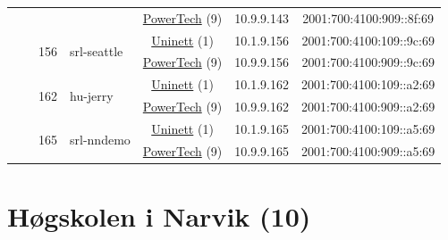\begin{small}
\begin{center}
\begin{longtable}{|c|c|c|c|c|c|c|c|}
  &  &  &  & \multicolumn{2}{|c|}{\tiny{\href{http://www.powertech.no}{PowerTech} (9)}} & \tiny{10.9.9.143} & \tiny{2001:700:4100:909::8f:69} \\* \cline{3-3}\cline{4-4}\cline{5-5}\cline{6-6}\cline{7-7}\cline{8-8}
  &  & \multirow{2}{*}{\tiny{156}} & \multicolumn{1}{|l|}{\multirow{2}{*}{\tiny{srl-seattle}}} & \multicolumn{2}{|c|}{\tiny{\href{https://www.uninett.no}{Uninett} (1)}} & \tiny{10.1.9.156} & \tiny{2001:700:4100:109::9c:69} \\* \cline{5-5}\cline{6-6}\cline{7-7}\cline{8-8}
  &  &  &  & \multicolumn{2}{|c|}{\tiny{\href{http://www.powertech.no}{PowerTech} (9)}} & \tiny{10.9.9.156} & \tiny{2001:700:4100:909::9c:69} \\* \cline{3-3}\cline{4-4}\cline{5-5}\cline{6-6}\cline{7-7}\cline{8-8}
  &  & \multirow{2}{*}{\tiny{162}} & \multicolumn{1}{|l|}{\multirow{2}{*}{\tiny{hu-jerry}}} & \multicolumn{2}{|c|}{\tiny{\href{https://www.uninett.no}{Uninett} (1)}} & \tiny{10.1.9.162} & \tiny{2001:700:4100:109::a2:69} \\* \cline{5-5}\cline{6-6}\cline{7-7}\cline{8-8}
  &  &  &  & \multicolumn{2}{|c|}{\tiny{\href{http://www.powertech.no}{PowerTech} (9)}} & \tiny{10.9.9.162} & \tiny{2001:700:4100:909::a2:69} \\* \cline{3-3}\cline{4-4}\cline{5-5}\cline{6-6}\cline{7-7}\cline{8-8}
  &  & \multirow{2}{*}{\tiny{165}} & \multicolumn{1}{|l|}{\multirow{2}{*}{\tiny{srl-nndemo}}} & \multicolumn{2}{|c|}{\tiny{\href{https://www.uninett.no}{Uninett} (1)}} & \tiny{10.1.9.165} & \tiny{2001:700:4100:109::a5:69} \\* \cline{5-5}\cline{6-6}\cline{7-7}\cline{8-8}
  &  &  &  & \multicolumn{2}{|c|}{\tiny{\href{http://www.powertech.no}{PowerTech} (9)}} & \tiny{10.9.9.165} & \tiny{2001:700:4100:909::a5:69} \\ \hline
\end{longtable}
\end{center}
\end{small}



\section{Høgskolen i Narvik (10)}
\label{sec:HiN}

